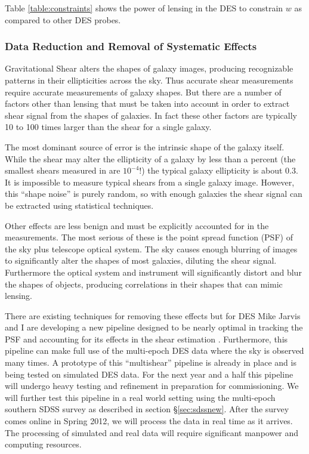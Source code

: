 \documentclass[12pt]{article}
\newcommand{\firstlight}{Spring 2012}
\begin{document}
Table \ref{table:constraints} shows the power of lensing in the DES to
constrain $w$ as compared to other DES probes.

\subsubsection{Data Reduction and Removal of Systematic Effects} 
\label{sec:des:process}

Gravitational Shear alters the shapes of galaxy images, producing recognizable
patterns in their ellipticities across the sky. Thus accurate shear
measurements require accurate measurements of galaxy shapes.  But there are a
number of factors other than lensing that must be taken into account in order
to extract shear signal from the shapes of galaxies. In fact these other
factors are typically 10 to 100 times larger than the shear for a single
galaxy.

The most dominant source of error is the intrinsic shape of the galaxy itself.
While the shear may alter the ellipticity of a galaxy by less than a percent
(the smallest shears measured in \cite{SheldonLensing07} are $10^{-4}$!) the
typical galaxy ellipticity is about 0.3.  It is impossible to measure typical
shears from a single galaxy image.  However, this ``shape noise'' is purely
random, so with enough galaxies the shear signal can be extracted using
statistical techniques.

Other effects are less benign and must be explicitly accounted for in the
measurements.  The most serious of these is the point spread function (PSF) of
the sky plus telescope optical system. The sky causes enough blurring of images
to significantly alter the shapes of most galaxies, diluting the shear signal.
Furthermore the optical system and instrument will significantly distort and
blur the shapes of objects, producing correlations in their shapes that can
mimic lensing.

There are existing techniques for removing these effects but for DES Mike
Jarvis and I are developing a new pipeline designed to be nearly optimal in
tracking the PSF and accounting for its effects in the shear estimation
\cite{Bern02,JarvisJain04}.  Furthermore, this pipeline can make full use of
the multi-epoch DES data where the sky is observed many times.  A prototype of
this ``multishear'' pipeline is already in place and is being tested on
simulated DES data.  For the next year and a half this pipeline will undergo
heavy testing and refinement in preparation for commissioning.  We will further
test this pipeline in a real world setting using the multi-epoch southern SDSS
survey as described in section \S \ref{sec:sdssnew}.  After the survey comes
online in \firstlight, we will process the data in real time as it arrives.  The
processing of simulated and real data will require significant manpower and
computing resources.
\end{document}
